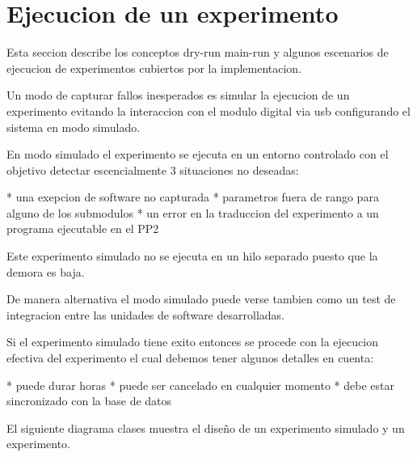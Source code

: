 \section{Ejecucion de un experimento}

Esta seccion describe los conceptos dry-run main-run y algunos escenarios de ejecucion de
experimentos cubiertos por la implementacion.


Un modo de capturar fallos inesperados es simular la ejecucion de un experimento evitando 
la interaccion con el modulo digital via usb configurando el sistema en modo simulado.

En modo simulado el experimento se ejecuta en un entorno controlado con el objetivo detectar
escencialmente 3 situaciones no deseadas:

* una exepcion de software no capturada
* parametros fuera de rango para alguno de los submodulos
* un error en la traduccion del experimento a un programa ejecutable en el PP2

Este experimento simulado no se ejecuta en un hilo separado puesto que la demora es baja.

De manera alternativa el modo simulado puede verse tambien como un test de integracion
entre las unidades de software desarrolladas.

Si el experimento simulado tiene exito entonces se procede con la ejecucion efectiva del experimento
el cual debemos tener algunos detalles en cuenta:

* puede durar horas
* puede ser cancelado en cualquier momento
* debe estar sincronizado con la base de datos

El siguiente diagrama clases muestra el diseño de un experimento simulado y un experimento.
